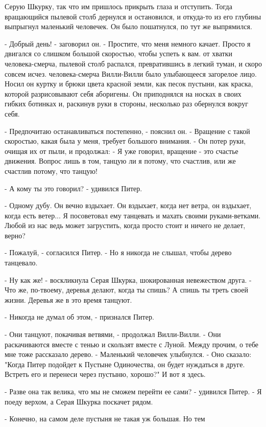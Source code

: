 Серую Шкурку, так что им пришлось прикрыть глаза и отступить. Тогда 
вращающийся пылевой столб дернулся и остановился, и откуда-то из его 
глубины выпрыгнул маленький человечек. Он было пошатнулся, по тут же 
выпрямился.
\par- Добрый день! - заговорил он. - Простите, что меня немного 
качает. Просто я двигался со слишком большой скоростью, чтобы успеть к 
вам.
 от хватки человека-смерча, пылевой столб распался, 
превратившись в легкий туман, и скоро совсем исчез.
 человека-смерча Вилли-Вилли было улыбающееся загорелое лицо. 
Носил он куртку и брюки цвета красной земли, как песок пустыни, как 
краска, которой разрисовывают себя аборигены. Он приподнялся на носках 
в своих гибких ботинках и, раскинув руки в стороны, несколько раз 
обернулся вокруг себя.
\par- Предпочитаю останавливаться постепенно, - пояснил он. - Вращение 
с такой скоростью, какая была у меня, требует большого внимания. - Он 
потер руки, очищая их от пыли, и продолжал: - Я уже говорил, вращение 
- это счастье движения. Вопрос лишь в том, танцую ли я потому, что 
счастлив, или же счастлив потому, что танцую!
\par- А кому ты это говорил? - удивился Питер.
\par- Одному дубу. Он вечно вздыхает. Он вздыхает, когда нет ветра, он 
вздыхает, когда есть ветер... Я посоветовал ему танцевать и махать 
своими руками-ветками. Любой из нас ведь может загрустить, когда 
просто стоит и ничего не делает, верно?
\par- Пожалуй, - согласился Питер. - Но я никогда не слышал, чтобы 
дерево танцевало.
\par- Ну как же! - воскликнула Серая Шкурка, шокированная невежеством 
друга. - Что же, по-твоему, деревья делают, когда ты спишь? А спишь ты 
треть своей жизни. Деревья же в это время танцуют.
\par- Никогда не думал об этом, - признался Питер.
\par- Они танцуют, покачивая ветвями, - продолжал Вилли-Вилли. - Они 
раскачиваются вместе с тенью и скользят вместе с Луной. Между прочим, 
о тебе мне тоже рассказало дерево. - Маленький человечек улыбнулся. - 
Оно сказало: "Когда Питер подойдет к Пустыне Одиночества, он будет 
нуждаться в друге. Встреть его и перенеси через пустыню, хорошо?" И 
вот я здесь.
\par- Разве она так велика, что мы не сможем перейти ее сами? - 
удивился Питер. - Я поеду верхом, а Серая Шкурка поскачет рядом.
\par- Конечно, на самом деле пустыня не такая уж большая. Но тем 
